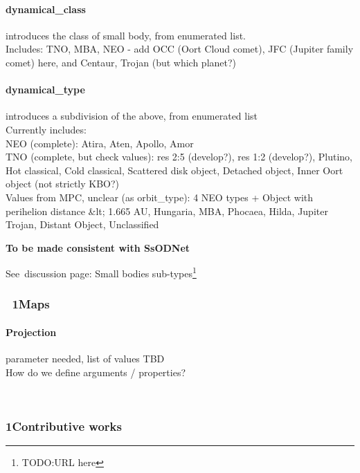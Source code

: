 \documentclass[11pt,a4paper]{ivoa}
\begin{document}
\paragraph{dynamical\_class}

introduces the class of small body, from enumerated list.\\Includes: TNO, MBA, NEO - add OCC (Oort Cloud comet), JFC (Jupiter family comet) here, and Centaur, Trojan (but which planet?)

\paragraph{\textbf{dynamical\_type}}

introduces a subdivision of the above, from enumerated list\\Currently includes: \\NEO (complete): Atira, Aten, Apollo, Amor\\TNO (complete, but check values): res 2:5 (develop?), res 1:2 (develop?), Plutino, Hot classical, Cold classical, Scattered disk object, Detached object, Inner Oort object (not strictly KBO?)\\Values from MPC, unclear (as orbit\_type): 4 NEO types + Object with perihelion distance \&lt; 1.665 AU, Hungaria, MBA, Phocaea, Hilda, Jupiter Trojan, Distant Object, Unclassified

\textbf{To be made consistent with SsODNet\emph{\\}}

See discussion page: Small bodies sub-types\footnote{TODO:URL here}

\subsubsection{ 1Maps\\}

\paragraph{Projection }

parameter needed, list of values TBD\\How do we define arguments / properties?

 

\subsubsection{1Contributive works\\}
\end{document}
